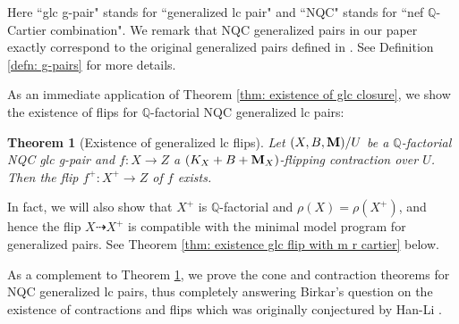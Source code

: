 \documentclass[11pt]{amsart}
\numberwithin{equation}{section}
\newcommand{\Mm}{{\bf{M}}}
\newcommand{\Qq}{\mathbb{Q}}
\newtheorem{thm}{Theorem}[section]
\theoremstyle{definition}
\theoremstyle{definition}
\theoremstyle{definition}
\begin{document}
Here ``glc g-pair" stands for ``generalized lc pair" and ``NQC" stands for ``nef $\Qq$-Cartier combination". We remark that NQC generalized pairs in our paper exactly correspond to the original generalized pairs defined in \cite{BZ16}. See Definition \ref{defn: g-pairs} for more details.

As an immediate application of Theorem \ref{thm: existence of glc closure}, we show the existence of flips for $\Qq$-factorial NQC generalized lc pairs:

\begin{thm}[Existence of generalized lc flips]\label{thm: existence of q-factorial glc flips}
Let $(X,B,\Mm)/U$ be a $\Qq$-factorial NQC glc g-pair and $f: X\rightarrow Z$ a $(K_X+B+\Mm_X)$-flipping contraction over $U$. Then the flip $f^+: X^+\rightarrow Z$ of $f$ exists.
\end{thm}
In fact, we will also show that $X^+$ is $\Qq$-factorial and $\rho(X)=\rho(X^+)$, and hence the flip $X\dasharrow X^+$ is compatible with the minimal model program for generalized pairs. See Theorem \ref{thm: existence glc flip with m r cartier} below.

\medskip

As a complement to Theorem \ref{thm: existence of q-factorial glc flips}, we prove the cone and contraction theorems for NQC generalized lc pairs, thus completely answering Birkar's question on the existence of contractions and flips \cite[6.1]{Bir20b} which was originally conjectured by Han-Li \cite[Conjectures 3.1, 3.3]{HL18}.
\end{document}
